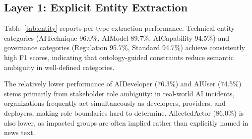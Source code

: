 \documentclass[a4paper,fleqn]{cas-dc}
\begin{document}
\subsection{Layer 1: Explicit Entity Extraction}

Table~\ref{tab:entity} reports per-type extraction performance.
Technical entity categories (AITechnique 96.0\%, AIModel
89.7\%, AICapability 94.5\%) and governance
categories (Regulation 95.7\%, Standard 94.7\%) achieve
consistently high F1 scores, indicating that ontology-guided
constraints reduce semantic ambiguity in well-defined
categories.

The relatively lower performance of AIDeveloper (76.3\%) and AIUser
(74.5\%) stems primarily from stakeholder role ambiguity: in
real-world AI incidents, organizations frequently act simultaneously
as developers, providers, and deployers, making role boundaries
hard to determine.
AffectedActor (86.0\%) is also lower, as impacted groups
are often implied rather than explicitly named in news text.
\end{document}
